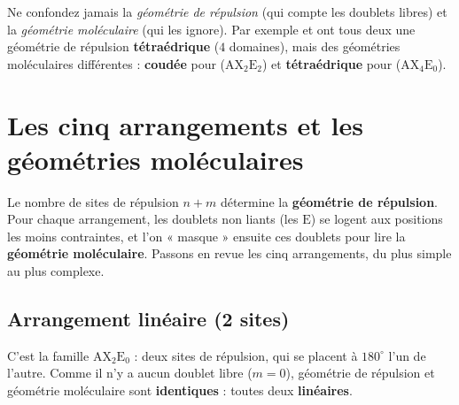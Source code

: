 \documentclass[11pt,a4paper]{article}
\newcommand{\AX}[2]{\ensuremath{\mathrm{AX_{#1}E_{#2}}}}
\begin{document}
\begin{attention}
Ne confondez jamais la \emph{géométrie de répulsion} (qui compte les doublets libres) et la
\emph{géométrie moléculaire} (qui les ignore). Par exemple  et  ont tous deux une
géométrie de répulsion \textbf{tétraédrique} ($4$ domaines), mais des géométries moléculaires
différentes : \textbf{coudée} pour  (\AX{2}{2}) et \textbf{tétraédrique} pour 
(\AX{4}{0}).
\end{attention}

\section{Les cinq arrangements et les géométries moléculaires}
\label{sec:geometries}

Le nombre de sites de répulsion $n+m$ détermine la \textbf{géométrie de répulsion}. Pour chaque
arrangement, les doublets non liants (les $\mathrm{E}$) se logent aux positions les moins
contraintes, et l'on « masque » ensuite ces doublets pour lire la \textbf{géométrie moléculaire}.
Passons en revue les cinq arrangements, du plus simple au plus complexe.

\subsection{Arrangement linéaire (2 sites)}

C'est la famille \AX{2}{0} : deux sites de répulsion, qui se placent à $180^\circ$ l'un de
l'autre. Comme il n'y a aucun doublet libre ($m=0$), géométrie de répulsion et géométrie
moléculaire sont \textbf{identiques} : toutes deux \textbf{linéaires}.
\end{document}
